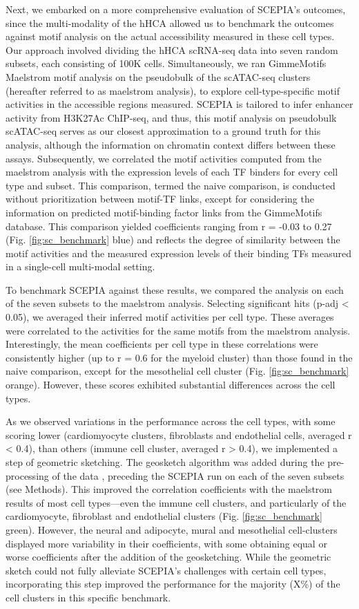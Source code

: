 Next, we embarked on a more comprehensive evaluation of SCEPIA's outcomes, since the multi-modality of the hHCA allowed us to benchmark the outcomes against motif analysis on the actual accessibility measured in these cell types. Our approach involved dividing the hHCA scRNA-seq data into seven random subsets, each consisting of 100K cells. Simultaneously, we ran GimmeMotifs Maelstrom\cite{Bruse_2018} motif analysis on the pseudobulk of the scATAC-seq clusters (hereafter referred to as maelstrom analysis), to explore cell-type-specific motif activities in the accessible regions measured. SCEPIA is tailored to infer enhancer activity from H3K27Ac ChIP-seq, and thus, this motif analysis on pseudobulk scATAC-seq serves as our closest approximation to a ground truth for this analysis, although the information on chromatin context differs between these assays. Subsequently, we correlated the motif activities computed from the maelstrom analysis with the expression levels of each TF binders for every cell type and subset. This comparison, termed the naive comparison, is conducted without prioritization between motif-TF links, except for considering the information on predicted motif-binding factor links from the GimmeMotifs database. This comparison yielded coefficients ranging from r = -0.03 to 0.27 (Fig. \ref{fig:sc_benchmark} blue) and reflects the degree of similarity between the motif activities and the measured expression levels of their binding TFs measured in a single-cell multi-modal setting.

To benchmark SCEPIA against these results, we compared the analysis on each of the seven subsets to the maelstrom analysis. Selecting significant hits (p-adj < 0.05), we averaged their inferred motif activities per cell type. These averages were correlated to the activities for the same motifs from the maelstrom analysis. Interestingly, the mean coefficients per cell type in these correlations were consistently higher (up to r = 0.6 for the myeloid cluster) than those found in the naive comparison, except for the mesothelial cell cluster (Fig. \ref{fig:sc_benchmark} orange). However, these scores exhibited substantial differences across the cell types.

As we observed variations in the performance across the cell types, with some scoring lower (cardiomyocyte clusters, fibroblasts and endothelial cells, averaged r < 0.4), than others (immune cell cluster, averaged r > 0.4), we implemented a step of geometric sketching. The geosketch algorithm was added during the pre-processing of the data \cite{Hie2019}, preceding the SCEPIA run on each of the seven subsets (see Methods). This improved the correlation coefficients with the maelstrom results of most cell types—even the immune cell clusters, and particularly of the cardiomyocyte, fibroblast and endothelial clusters (Fig. \ref{fig:sc_benchmark} green). However, the neural and adipocyte, mural and mesothelial cell-clusters displayed more variability in their coefficients, with some obtaining equal or worse coefficients after the addition of the geosketching. While the geometric sketch could not fully alleviate SCEPIA's challenges with certain cell types, incorporating this step improved the performance for the majority (X\%) of the cell clusters in this specific benchmark. 

